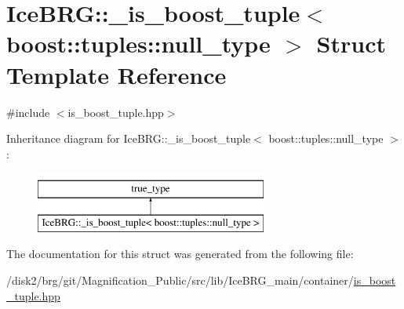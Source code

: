 \hypertarget{structIceBRG_1_1__is__boost__tuple_3_01boost_1_1tuples_1_1null__type_01_4}{}\section{Ice\+B\+R\+G\+:\+:\+\_\+is\+\_\+boost\+\_\+tuple$<$ boost\+:\+:tuples\+:\+:null\+\_\+type $>$ Struct Template Reference}
\label{structIceBRG_1_1__is__boost__tuple_3_01boost_1_1tuples_1_1null__type_01_4}


{\ttfamily \#include $<$is\+\_\+boost\+\_\+tuple.\+hpp$>$}

Inheritance diagram for Ice\+B\+R\+G\+:\+:\+\_\+is\+\_\+boost\+\_\+tuple$<$ boost\+:\+:tuples\+:\+:null\+\_\+type $>$\+:\begin{figure}[H]
\begin{center}
\leavevmode
\includegraphics[height=2.000000cm]{structIceBRG_1_1__is__boost__tuple_3_01boost_1_1tuples_1_1null__type_01_4}
\end{center}
\end{figure}


The documentation for this struct was generated from the following file\+:\begin{DoxyCompactItemize}
\item 
/disk2/brg/git/\+Magnification\+\_\+\+Public/src/lib/\+Ice\+B\+R\+G\+\_\+main/container/\hyperlink{is__boost__tuple_8hpp}{is\+\_\+boost\+\_\+tuple.\+hpp}\end{DoxyCompactItemize}
